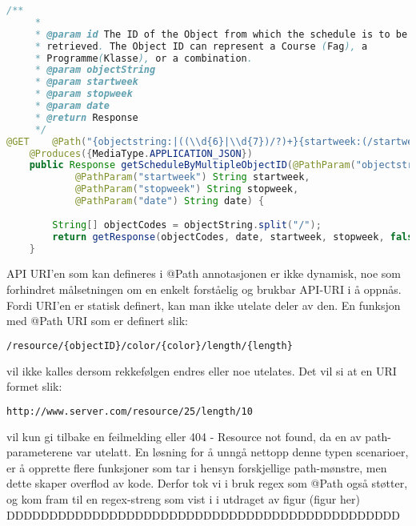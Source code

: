 \documentclass[../main.tex]{subfiles}
\begin{document}
\begin{lstlisting}[language=Java, frame=single, caption={asdasdsadasdasdasdsadsadasdasdsadsa}]
  /**
     *
     * @param id The ID of the Object from which the schedule is to be
     * retrieved. The Object ID can represent a Course (Fag), a
     * Programme(Klasse), or a combination.
     * @param objectString
     * @param startweek
     * @param stopweek
     * @param date
     * @return Response
     */
@GET    @Path("{objectstring:|((\\d{6}|\\d{7})/?)+}{startweek:(/startweek/[^/]+?)?}{stopweek:(/stopweek/[^/]+?)?}{date:(/date/[^/]+?)?}")
    @Produces({MediaType.APPLICATION_JSON})
    public Response getScheduleByMultipleObjectID(@PathParam("objectstring") String objectString,
            @PathParam("startweek") String startweek,
            @PathParam("stopweek") String stopweek,
            @PathParam("date") String date) {
       
        String[] objectCodes = objectString.split("/");        
        return getResponse(objectCodes, date, startweek, stopweek, false);
    }
\end{lstlisting}

API URI’en som kan defineres i @Path annotasjonen er ikke dynamisk, noe som forhindret målsetningen om en enkelt forståelig og brukbar API-URI i å oppnås. Fordi URI’en er statisk definert, kan man ikke utelate deler av den. En funksjon med @Path URI som er definert slik:

\begin{lstlisting}[language=HTML, frame=single, caption={asdasdsadasdasdasdsadsadasdasdsadsa}]
/resource/{objectID}/color/{color}/length/{length}
\end{lstlisting}

vil ikke kalles dersom rekkefølgen endres eller noe utelates. Det vil si at en URI formet slik:

\begin{lstlisting}[language=HTML, frame=single, caption={asdasdsadasdasdasdsadsadasdasdsadsa}]
http://www.server.com/resource/25/length/10
\end{lstlisting}

vil kun gi tilbake en feilmelding eller 404 - Resource not found, da en av path-parameterene var utelatt. En løsning for å unngå nettopp denne typen scenarioer, er å opprette flere funksjoner som tar i hensyn forskjellige path-mønstre, men dette skaper overflod av kode.
Derfor tok vi i bruk regex som @Path også støtter, og kom fram til en regex-streng som vist i i utdraget av figur (figur her) DDDDDDDDDDDDDDDDDDDDDDDDDDDDDDDDDDDDDDDDDDDDDD
\end{document}

